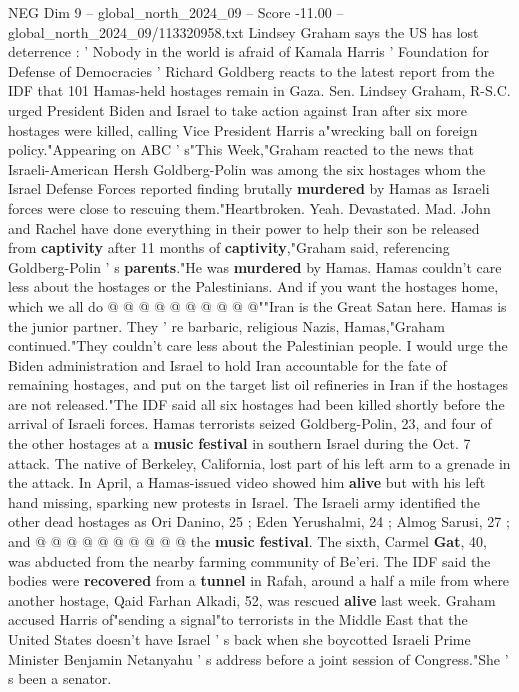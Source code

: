 \begin{textsample}{NEG Dim 9 – global\_north\_2024\_09 – Score -11.00 – global\_north\_2024\_09/113320958.txt}  \label{ex:f9_neg_012}
Lindsey Graham says the US has lost deterrence : ' Nobody in the world is afraid of Kamala Harris ' Foundation for Defense of Democracies ' Richard Goldberg reacts to the latest report from the IDF that 101 Hamas-held hostages remain in Gaza.
Sen.
Lindsey Graham, R-S.C. urged President Biden and Israel to take action against Iran after six more hostages were killed, calling Vice President Harris a"wrecking ball on foreign policy."Appearing on ABC ' s"This Week,"Graham reacted to the news that Israeli-American Hersh Goldberg-Polin was among the six hostages whom the Israel Defense Forces reported finding brutally \textbf{murdered} by Hamas as Israeli forces were close to rescuing them."Heartbroken.
Yeah.
Devastated.
Mad.
John and Rachel have done everything in their power to help their son be released from \textbf{captivity} after 11 months of \textbf{captivity},"Graham said, referencing Goldberg-Polin ' s \textbf{parents}."He was \textbf{murdered} by Hamas.
Hamas couldn't care less about the hostages or the Palestinians.
And if you want the hostages home, which we all do @ @ @ @ @ @ @ @ @ @""Iran is the Great Satan here.
Hamas is the junior partner.
They ' re barbaric, religious Nazis, Hamas,"Graham continued."They couldn't care less about the Palestinian people.
I would urge the Biden administration and Israel to hold Iran accountable for the fate of remaining hostages, and put on the target list oil refineries in Iran if the hostages are not released."The IDF said all six hostages had been killed shortly before the arrival of Israeli forces.
Hamas terrorists seized Goldberg-Polin, 23, and four of the other hostages at a \textbf{music} \textbf{festival} in southern Israel during the Oct. 7 attack.
The native of Berkeley, California, lost part of his left arm to a grenade in the attack.
In April, a Hamas-issued video showed him \textbf{alive} but with his left hand missing, sparking new protests in Israel.
The Israeli army identified the other dead hostages as Ori Danino, 25 ; Eden Yerushalmi, 24 ; Almog Sarusi, 27 ; and @ @ @ @ @ @ @ @ @ @ the \textbf{music} \textbf{festival}.
The sixth, Carmel \textbf{Gat}, 40, was abducted from the nearby farming community of Be'eri.
The IDF said the bodies were \textbf{recovered} from a \textbf{tunnel} in Rafah, around a half a mile from where another hostage, Qaid Farhan Alkadi, 52, was rescued \textbf{alive} last week.
Graham accused Harris of"sending a signal"to terrorists in the Middle East that the United States doesn't have Israel ' s back when she boycotted Israeli Prime Minister Benjamin Netanyahu ' s address before a joint session of Congress."She ' s been a senator.

\end{textsample}
